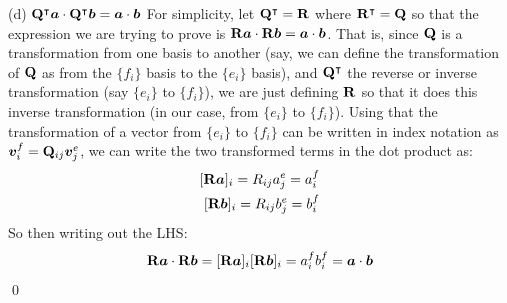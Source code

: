 \medskip
(d) $\mathbf{Q}^\intercal\bm{a} \cdot \mathbf{Q}^\intercal\bm{b} = \bm{a}\cdot\bm{b} $ \newline
For simplicity, let $\mathbf{Q}^\intercal = \mathbf{R}$ where $\mathbf{R}^\intercal = \mathbf{Q}$ so that the expression we are trying to prove is $\mathbf{R}\bm{a} \cdot \mathbf{R}\bm{b} = \bm{a}\cdot\bm{b}$. That is, since $\mathbf{Q}$ is a transformation from one basis to another (say, we can define the transformation of $\mathbf{Q}$ as from the $\{f_i\}$ basis to the $\{e_i\}$ basis), and $\mathbf{Q}^\intercal$ the reverse or inverse transformation (say $\{e_i\}$ to $\{f_i\}$), we are just defining $\mathbf{R}$ so that it does this inverse transformation (in our case, from $\{e_i\}$ to $\{f_i\}$). \newline
Using that the transformation of a vector from $\{e_i\}$ to $\{f_i\}$ can be written in index notation as $\bm{v}^f_i = \mathbf{Q}_{ij}\bm{v}^e_j$, we can write the two transformed terms in the dot product as:
\begin{equation}
    \begin{split}
    [\bn{R}\bm{a}]_i = R_{ij}a^e_j = a^f_i \\
    [\bn{R}\bm{b}]_i = R_{ij}b^e_j = b^f_i
    \end{split}
\end{equation}
So then writing out the LHS:
\begin{equation}
    \mathbf{R}\bm{a} \cdot \mathbf{R}\bm{b} =[\mathbf{R}\bm{a}]_i[\mathbf{R}\bm{b}]_i = a^f_ib^f_i = \bm{a}\cdot\bm{b}
\end{equation} \qed
\newpage


